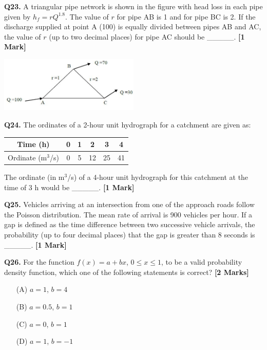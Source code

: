 \documentclass[11pt]{article}
\newcommand{\questiona}[2]{
    \noindent\textbf{Q#2.} #1 \hfill \textbf{[1 Mark]}
}
\newcommand{\questionb}[2]{
    \noindent\textbf{Q#2.} #1 \hfill \textbf{[2 Marks]}
}
\begin{document}
\vspace{0.5cm}

\questiona{A triangular pipe network is shown in the figure with head loss in each pipe given by $h_f = rQ^{1.8}$. The value of $r$ for pipe AB is 1 and for pipe BC is 2. If the discharge supplied at point A (100) is equally divided between pipes AB and AC, the value of $r$ (up to two decimal places) for pipe AC should be \_\_\_\_\_.}{23}
\begin{center}
\includegraphics[width=0.5\textwidth]{figures/23.png}
\end{center}

\vspace{0.5cm}

\questiona{The ordinates of a 2-hour unit hydrograph for a catchment are given as:
\begin{tabular}{|c|c|c|c|c|c|}
\hline
Time (h) & 0 & 1 & 2 & 3 & 4 \\
\hline
Ordinate (m$^3$/s) & 0 & 5 & 12 & 25 & 41 \\
\hline
\end{tabular}
The ordinate (in m$^3$/s) of a 4-hour unit hydrograph for this catchment at the time of 3 h would be \_\_\_\_\_.}{24}

\vspace{0.5cm}

\questiona{Vehicles arriving at an intersection from one of the approach roads follow the Poisson distribution. The mean rate of arrival is 900 vehicles per hour. If a gap is defined as the time difference between two successive vehicle arrivals, the probability (up to four decimal places) that the gap is greater than 8 seconds is \_\_\_\_\_.}{25}

\vspace{0.5cm}

\questionb{For the function $f(x) = a + bx$, $0 \leq x \leq 1$, to be a valid probability density function, which one of the following statements is correct?}{26}
\begin{enumerate}
    \item[(A)] $a = 1$, $b = 4$
    \item[(B)] $a = 0.5$, $b = 1$
    \item[(C)] $a = 0$, $b = 1$
    \item[(D)] $a = 1$, $b = -1$
\end{enumerate}
\end{document}
